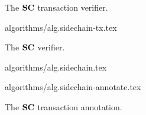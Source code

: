 \begin{figure}[tb]
\begin{minipage}[t]{0.48\textwidth}
   \begin{algorithm}[H]
     \caption{\label{alg.sidechain-tx}The $\mathbf{SC}$ transaction verifier.}
     \begin{algorithmic}[1]
       {algorithms/alg.sidechain-tx.tex}
     \end{algorithmic}
   \end{algorithm}
\end{minipage}
\textwidth
\begin{minipage}[t]{0.45\textwidth}
   \begin{algorithm}[H]
     \caption{\label{alg.sidechain}The $\mathbf{SC}$ verifier.}
     \begin{algorithmic}[1]
       {algorithms/alg.sidechain.tex}
     \end{algorithmic}
   \end{algorithm}
   \begin{algorithm}[H]
     \caption{\label{alg.sidechain-annotate}The $\mathbf{SC}$ transaction annotation.}
     \begin{algorithmic}[1]
       {algorithms/alg.sidechain-annotate.tex}
     \end{algorithmic}
   \end{algorithm}
\end{minipage}
\end{figure}
